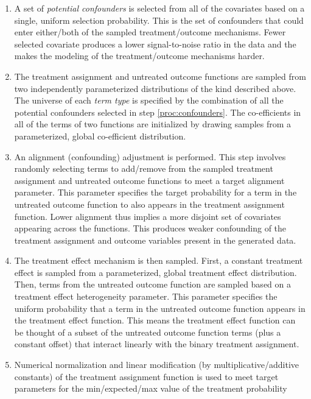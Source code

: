 \documentclass[../main.tex]{subfiles}
\begin{document}
\begin{enumerate}
    \item A set of \textit{potential confounders} is selected from all of the covariates based on a single, uniform selection probability. This is the set of confounders that could enter either/both of the sampled treatment/outcome mechanisms. Fewer selected covariate produces a lower signal-to-noise ratio in the data and the makes the modeling of the treatment/outcome mechanisms harder. \label{proc:confounders}
    
    \item The treatment assignment and untreated outcome functions are sampled from two independently parameterized distributions of the kind described above. The universe of each \textit{term type} is specified by the combination of all the potential confounders selected in step \ref{proc:confounders}. The co-efficients in all of the terms of two functions are initialized by drawing samples from a parameterized, global co-efficient distribution.
    
    \item An alignment (confounding) adjustment is performed. This step involves randomly selecting terms to add/remove from the sampled treatment assignment and untreated outcome functions to meet a target alignment parameter. This parameter specifies the target probability for a term in the untreated outcome function to also appears in the treatment assignment function. Lower alignment thus implies a more disjoint set of covariates appearing across the functions. This produces weaker confounding of the treatment assignment and outcome variables present in the generated data.
    
    \item The treatment effect mechanism is then sampled. First, a constant treatment effect is sampled from a parameterized, global treatment effect distribution. Then, terms from the untreated outcome function are sampled based on a treatment effect heterogeneity parameter. This parameter specifies the uniform probability that a term in the untreated outcome function appears in the treatment effect function. This means the treatment effect function can be thought of a subset of the untreated outcome function terms (plus a constant offset) that interact linearly with the binary treatment assignment.
    
    \item Numerical normalization and linear modification (by multiplicative/additive constants) of the treatment assignment function is used to meet target parameters for the min/expected/max value of the treatment probability
    

\end{enumerate}
\end{document}
